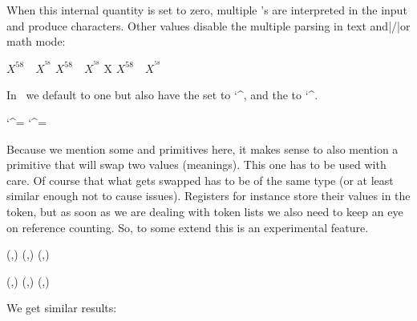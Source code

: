 When this internal quantity is set to zero, multiple \type {^}'s are interpreted
in the input and produce characters. Other values disable the multiple parsing in
text and|/|or math mode:

\startbuffer
{} $ X^58 \quad X^^58 $
 $ X^58 \quad X^^58 $ ^^58
 $ X^58 \quad X^^58 $ %
\stopbuffer

\typebuffer

In \CONTEXT\ we default to one but also have the  set to \the
\catcode`^, and the  to \the \amcode `^.

\startlines
\catcode`^=\superscriptcatcode %
\amcode `^=\superscriptcatcode
\getbuffer
\stoplines


\stopnewprimitive

\startnewprimitive[title={\prm {swapcsvalues}}]

Because we mention some  and  primitives here, it makes
sense to also mention a primitive that will swap two values (meanings). This one
has to be used with care. Of course that what gets swapped has to be of the same
type (or at least similar enough not to cause issues). Registers for instance
store their values in the token, but as soon as we are dealing with token lists
we also need to keep an eye on reference counting. So, to some extend this is
an experimental feature.

\startbuffer
{} 
(\the\scratchcounterone,\the\scratchcountertwo)
\swapcsvalues \scratchcounterone \scratchcountertwo
(\the\scratchcounterone,\the\scratchcountertwo)
\swapcsvalues \scratchcounterone \scratchcountertwo
(\the\scratchcounterone,\the\scratchcountertwo)

 
(\the\scratchcounterone,\the\scratchcountertwo)
\bgroup
\swapcsvalues \scratchcounterone \scratchcountertwo
(\the\scratchcounterone,\the\scratchcountertwo)
\egroup
(\the\scratchcounterone,\the\scratchcountertwo)
\stopbuffer

\typebuffer

We get similar results:

\startlines
\getbuffer
\stoplines

\stopnewprimitive

